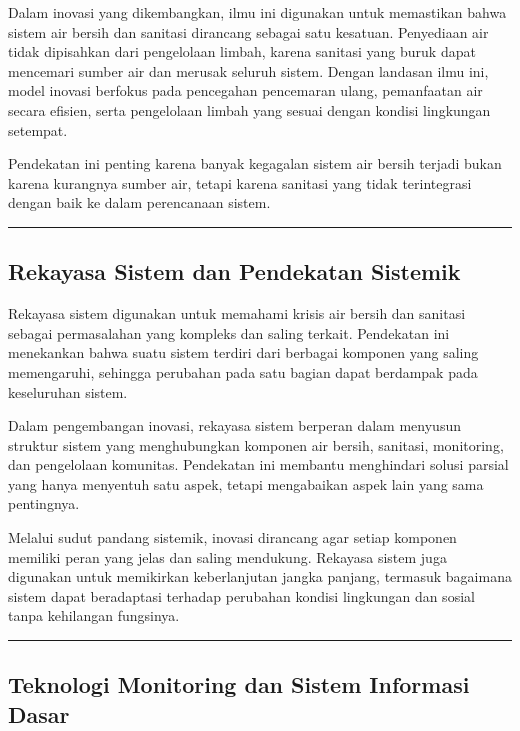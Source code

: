 \documentclass[
  letterpaper,
  DIV=11,
  numbers=noendperiod]{scrreprt}
\begin{document}
Dalam inovasi yang dikembangkan, ilmu ini digunakan untuk memastikan
bahwa sistem air bersih dan sanitasi dirancang sebagai satu kesatuan.
Penyediaan air tidak dipisahkan dari pengelolaan limbah, karena sanitasi
yang buruk dapat mencemari sumber air dan merusak seluruh sistem. Dengan
landasan ilmu ini, model inovasi berfokus pada pencegahan pencemaran
ulang, pemanfaatan air secara efisien, serta pengelolaan limbah yang
sesuai dengan kondisi lingkungan setempat.

Pendekatan ini penting karena banyak kegagalan sistem air bersih terjadi
bukan karena kurangnya sumber air, tetapi karena sanitasi yang tidak
terintegrasi dengan baik ke dalam perencanaan sistem.

\begin{center}\rule{0.5\linewidth}{0.5pt}\end{center}

\subsection{Rekayasa Sistem dan Pendekatan
Sistemik}\label{rekayasa-sistem-dan-pendekatan-sistemik}

Rekayasa sistem digunakan untuk memahami krisis air bersih dan sanitasi
sebagai permasalahan yang kompleks dan saling terkait. Pendekatan ini
menekankan bahwa suatu sistem terdiri dari berbagai komponen yang saling
memengaruhi, sehingga perubahan pada satu bagian dapat berdampak pada
keseluruhan sistem.

Dalam pengembangan inovasi, rekayasa sistem berperan dalam menyusun
struktur sistem yang menghubungkan komponen air bersih, sanitasi,
monitoring, dan pengelolaan komunitas. Pendekatan ini membantu
menghindari solusi parsial yang hanya menyentuh satu aspek, tetapi
mengabaikan aspek lain yang sama pentingnya.

Melalui sudut pandang sistemik, inovasi dirancang agar setiap komponen
memiliki peran yang jelas dan saling mendukung. Rekayasa sistem juga
digunakan untuk memikirkan keberlanjutan jangka panjang, termasuk
bagaimana sistem dapat beradaptasi terhadap perubahan kondisi lingkungan
dan sosial tanpa kehilangan fungsinya.

\begin{center}\rule{0.5\linewidth}{0.5pt}\end{center}

\subsection{Teknologi Monitoring dan Sistem Informasi
Dasar}\label{teknologi-monitoring-dan-sistem-informasi-dasar}
\end{document}
